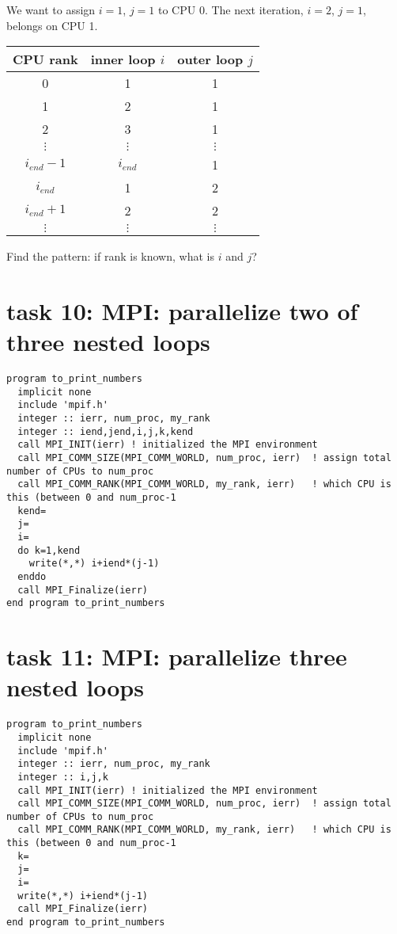 \documentclass[12pt]{report}
\begin{document}
We want to assign $i=1$, $j=1$ to CPU 0. The next iteration, $i=2$, $j=1$, belongs on CPU 1. 
\begin{center}
\begin{tabular}{|c|c|c|}\hline
CPU rank & inner loop $i$ & outer loop $j$ \\\hline
0   & 1   & 1 \\
1   & 2   & 1 \\
2   & 3   & 1 \\
$\vdots$   & $\vdots$   & $\vdots$ \\
$i_{end}-1$   & $i_{end}$   & 1 \\
$i_{end}$   & 1   & 2 \\
$i_{end}+1$   & 2   & 2 \\
$\vdots$   & $\vdots$   & $\vdots$ \\\hline
\end{tabular}
\end{center}
Find the pattern: if rank is known, what is $i$ and $j$?

\section{task 10: MPI: parallelize two of three nested loops}
\begin{verbatim}
program to_print_numbers
  implicit none
  include 'mpif.h'
  integer :: ierr, num_proc, my_rank  
  integer :: iend,jend,i,j,k,kend
  call MPI_INIT(ierr) ! initialized the MPI environment
  call MPI_COMM_SIZE(MPI_COMM_WORLD, num_proc, ierr)  ! assign total number of CPUs to num_proc
  call MPI_COMM_RANK(MPI_COMM_WORLD, my_rank, ierr)   ! which CPU is this (between 0 and num_proc-1
  kend=
  j=
  i=
  do k=1,kend
    write(*,*) i+iend*(j-1)
  enddo
  call MPI_Finalize(ierr)
end program to_print_numbers   
\end{verbatim}

\section{task 11: MPI: parallelize three nested loops}
\begin{verbatim}
program to_print_numbers
  implicit none
  include 'mpif.h'
  integer :: ierr, num_proc, my_rank  
  integer :: i,j,k
  call MPI_INIT(ierr) ! initialized the MPI environment
  call MPI_COMM_SIZE(MPI_COMM_WORLD, num_proc, ierr)  ! assign total number of CPUs to num_proc
  call MPI_COMM_RANK(MPI_COMM_WORLD, my_rank, ierr)   ! which CPU is this (between 0 and num_proc-1
  k=
  j=
  i=
  write(*,*) i+iend*(j-1)
  call MPI_Finalize(ierr)
end program to_print_numbers   
\end{verbatim}
\end{document}
